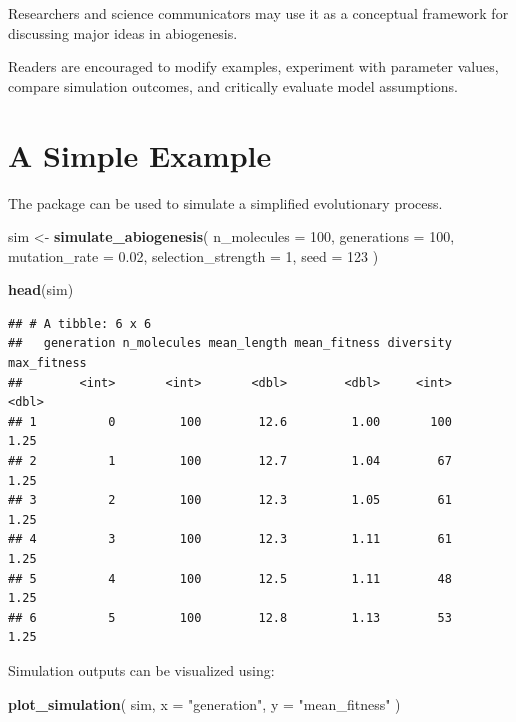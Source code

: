 \documentclass[
  oneside,
  openany]{book}
\newenvironment{Shaded}{\begin{snugshade}}{\end{snugshade}}
\newcommand{\AttributeTok}[1]{\textcolor[rgb]{0.13,0.29,0.53}{#1}}
\newcommand{\DecValTok}[1]{\textcolor[rgb]{0.00,0.00,0.81}{#1}}
\newcommand{\FloatTok}[1]{\textcolor[rgb]{0.00,0.00,0.81}{#1}}
\newcommand{\FunctionTok}[1]{\textcolor[rgb]{0.13,0.29,0.53}{\textbf{#1}}}
\newcommand{\NormalTok}[1]{#1}
\newcommand{\OtherTok}[1]{\textcolor[rgb]{0.56,0.35,0.01}{#1}}
\newcommand{\StringTok}[1]{\textcolor[rgb]{0.31,0.60,0.02}{#1}}
\begin{document}
Researchers and science communicators may use it as a conceptual framework for discussing major ideas in abiogenesis.

Readers are encouraged to modify examples, experiment with parameter values, compare simulation outcomes, and critically evaluate model assumptions.

\section*{A Simple Example}\label{a-simple-example}

The package can be used to simulate a simplified evolutionary process.

\begin{Shaded}
\begin{Highlighting}[]
\NormalTok{sim }\OtherTok{\textless{}{-}} \FunctionTok{simulate\_abiogenesis}\NormalTok{(}
  \AttributeTok{n\_molecules =} \DecValTok{100}\NormalTok{,}
  \AttributeTok{generations =} \DecValTok{100}\NormalTok{,}
  \AttributeTok{mutation\_rate =} \FloatTok{0.02}\NormalTok{,}
  \AttributeTok{selection\_strength =} \DecValTok{1}\NormalTok{,}
  \AttributeTok{seed =} \DecValTok{123}
\NormalTok{)}

\FunctionTok{head}\NormalTok{(sim)}
\end{Highlighting}
\end{Shaded}

\begin{verbatim}
## # A tibble: 6 x 6
##   generation n_molecules mean_length mean_fitness diversity max_fitness
##        <int>       <int>       <dbl>        <dbl>     <int>       <dbl>
## 1          0         100        12.6         1.00       100        1.25
## 2          1         100        12.7         1.04        67        1.25
## 3          2         100        12.3         1.05        61        1.25
## 4          3         100        12.3         1.11        61        1.25
## 5          4         100        12.5         1.11        48        1.25
## 6          5         100        12.8         1.13        53        1.25
\end{verbatim}

Simulation outputs can be visualized using:

\begin{Shaded}
\begin{Highlighting}[]
\FunctionTok{plot\_simulation}\NormalTok{(}
\NormalTok{  sim,}
  \AttributeTok{x =} \StringTok{"generation"}\NormalTok{,}
  \AttributeTok{y =} \StringTok{"mean\_fitness"}
\NormalTok{)}
\end{Highlighting}
\end{Shaded}
\end{document}
